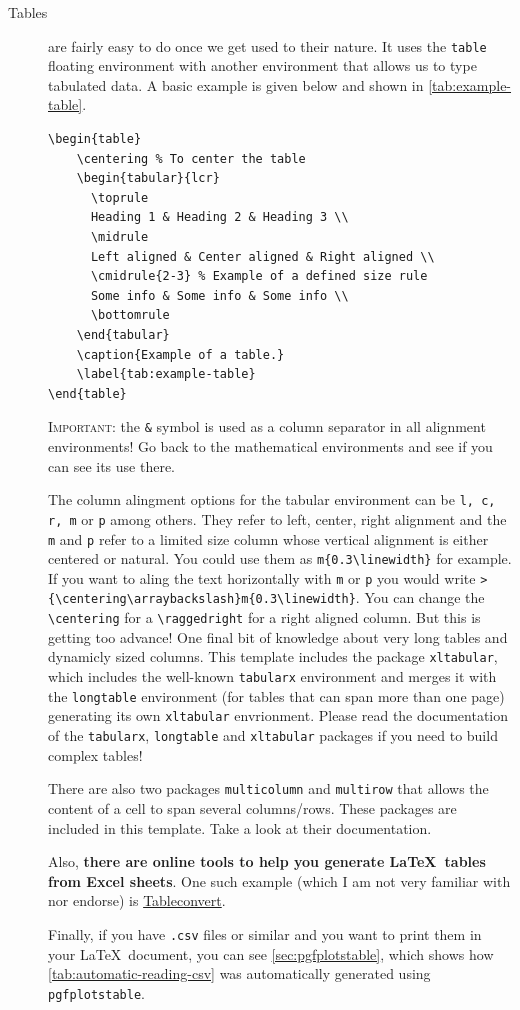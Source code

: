 \begin{description}
	\item[Tables] are fairly easy to do once we get used to their nature. It uses the \verb|table| floating environment with another environment that allows us to type tabulated data. A basic example is given below and shown in \cref{tab:example-table}.
\begin{lstlisting}[language={[LaTeX]TeX}]
\begin{table}
	\centering % To center the table
	\begin{tabular}{lcr}
	  \toprule
	  Heading 1 & Heading 2 & Heading 3 \\
	  \midrule
	  Left aligned & Center aligned & Right aligned \\
	  \cmidrule{2-3} % Example of a defined size rule
	  Some info & Some info & Some info \\
	  \bottomrule
	\end{tabular}
	\caption{Example of a table.}
	\label{tab:example-table}
\end{table}
\end{lstlisting}
	\textsc{\color{red}Important:} the \texttt{\&} symbol is used as a column separator in all alignment environments! Go back to the mathematical environments and see if you can see its use there.

	The column alingment options for the tabular environment can be \texttt{l, c, r, m{}} or \texttt{p{}} among others. They refer to left, center, right alignment and the \texttt{m{}} and \texttt{p{}} refer to a limited size column whose vertical alignment is either centered or natural. You could use them as \verb|m{0.3\linewidth}| for example. If you want to aling the text horizontally with \texttt{m} or \texttt{p} you would write \verb|>{\centering\arraybackslash}m{0.3\linewidth}|. You can change the \verb|\centering| for a \verb|\raggedright| for a right aligned column. But this is getting too advance!
	One final bit of knowledge about very long tables and dynamicly sized columns. This template includes the package \texttt{xltabular}, which includes the well-known \verb|tabularx| environment and merges it with the \verb|longtable| environment (for tables that can span more than one page) generating its own \verb|xltabular| envrionment. Please read the documentation of the \texttt{tabularx}, \verb|longtable| and \verb|xltabular| packages if you need to build complex tables!

	There are also two packages \verb|multicolumn| and \verb|multirow| that allows the content of a cell to span several columns/rows. These packages are included in this template. Take a look at their documentation.

	Also, \textbf{there are online tools to help you generate \LaTeX\ tables from Excel sheets}. One such example (which I am not very familiar with nor endorse) is \href{https://tableconvert.com/excel-to-latex}{Tableconvert}.

	Finally, if you have \texttt{.csv} files or similar and you want to print them in your \LaTeX\ document, you can see \cref{sec:pgfplotstable}, which shows how \cref{tab:automatic-reading-csv} was automatically generated using \verb|pgfplotstable|.
\end{description}

